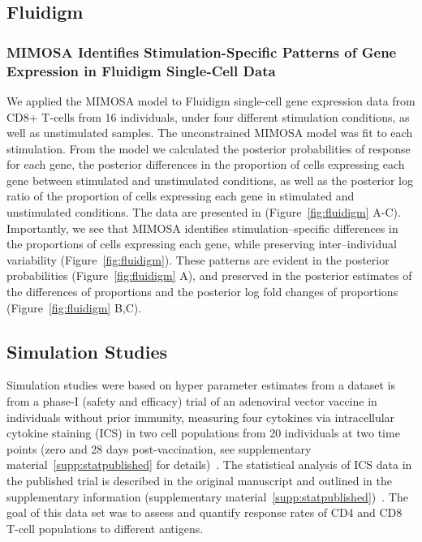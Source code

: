 \documentclass[11pt]{article}
\begin{document}
\subsection{Fluidigm}
\subsubsection{MIMOSA Identifies Stimulation-Specific Patterns of Gene Expression in Fluidigm Single-Cell Data}
We applied the MIMOSA model to Fluidigm single-cell gene expression data from CD8+ T-cells from 16 individuals, under four different stimulation conditions, as well as unstimulated samples. The unconstrained MIMOSA model was fit to each stimulation. From the model we calculated the posterior probabilities of response for each gene, the posterior differences in the proportion of cells expressing each gene between stimulated and unstimulated conditions, as well as the posterior log ratio of the proportion of cells expressing each gene in stimulated and unstimulated conditions. The data are presented in (Figure~\ref{fig:fluidigm} A-C). Importantly, we see that MIMOSA identifies stimulation--specific differences in the proportions of cells expressing each gene, while preserving inter--individual variability (Figure~\ref{fig:fluidigm}). These patterns are evident in the  posterior probabilities (Figure~\ref{fig:fluidigm} A), and preserved in the posterior estimates of the differences of proportions and the posterior log fold changes of proportions (Figure~\ref{fig:fluidigm} B,C). 
 
\subsection{Simulation Studies}

Simulation studies were based on hyper parameter estimates from a dataset is from a phase-I (safety and efficacy) trial of an adenoviral vector vaccine in individuals without prior immunity, measuring four cytokines via intracellular cytokine staining (ICS) in two cell populations from 20 individuals at two time points (zero and 28 days post-vaccination, see supplementary material~\ref{supp:statpublished} for details)~\cite{Peiperl:2010ej}. The statistical analysis of ICS data in the published trial is described in the original manuscript and outlined in the supplementary information (supplementary material~\ref{supp:statpublished})~\cite{Peiperl:2010ej}. The goal of this data set was to assess and quantify response rates of CD4 and CD8 T-cell populations to different antigens.
\end{document}
